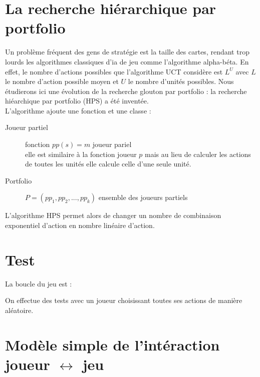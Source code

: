 \documentclass[a4paper, 11pt]{article}
\theoremstyle{definition}
\begin{document}
\section{La recherche hiérarchique par portfolio}
Un problème fréquent des gens de stratégie est la taille des cartes, rendant trop
lourds les algorithmes classiques d'ia de jeu comme l'algorithme alpha-béta. 
En effet, le nombre d'actions possibles que l'algorithme UCT considère est $L^U$
avec $L$ le nombre d'action possible moyen et $U$ le nombre d'unités possibles.
Nous étudierons ici une évolution de la recherche glouton par portfolio : la
recherche hiéarchique par portfolio (HPS) a été inventée.\\
L'algorithme ajoute une fonction et une classe :
\begin{description}
    \item[Joueur partiel] fonction $pp(s) = m$ joueur pariel \\
    elle est similaire à la fonction joueur $p$ mais au lieu de calculer les actions
    de toutes les unités elle calcule celle d'une seule unité.
    \item[Portfolio] $P = (pp_1, pp_2, ..., pp_k)$ ensemble des joueurs partiels
\end{description}
    L'algorithme HPS permet alors de changer un nombre de combinaison exponentiel
d'action en nombre linéaire d'action.

\section{Test}
La boucle du jeu est :
\begin{center}
\end{center}

On effectue des tests avec un joueur choisissant toutes ses actions de manière aléatoire.

\newpage

\section*{Modèle simple de l'intéraction joueur $\leftrightarrow$ jeu}
\end{document}
